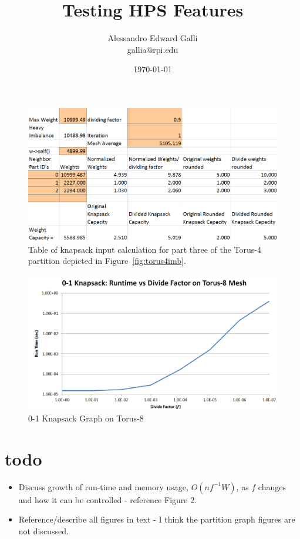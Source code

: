 \documentclass[a4paper]{article}
\title{Testing HPS Features}
\author{Alessandro Edward Galli\\gallia@rpi.edu}
\date{\today}
\begin{document}
\maketitle

\begin{figure}
  \centering
  \includegraphics[width=1\textwidth]{knapsack.PNG}
  \caption{\label{fig:knapsacktable}Table of knapsack input calculation for part three of the Torus-4 partition depicted in Figure~\ref{fig:torus4imb}.}
\end{figure} 

\begin{figure}
  \centering
  \includegraphics[width=1\textwidth]{Knapsack_Runtime_graph.PNG}
  \caption{\label{fig:knapruntime}0-1 Knapsack Graph on Torus-8}
\end{figure} 

\section{todo}

\begin{itemize}
\item Discuss growth of run-time and memory usage, $O(nf^{-1}W)$, as $f$ changes and how it can be controlled - reference Figure 2.
\item Reference/describe all figures in text - I think the partition graph figures are not discussed.
\end{itemize}
\end{document}
